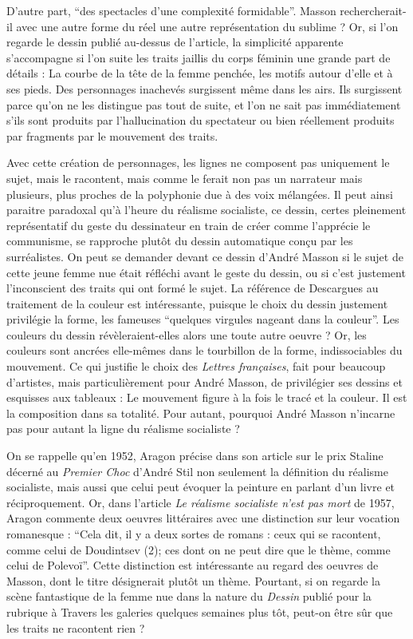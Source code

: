 	D’autre part, \enquote{des spectacles d’une complexité formidable}. Masson rechercherait-il avec une autre forme du réel une autre représentation du sublime ?  Or, si l’on regarde le dessin publié au-dessus de l’article, la simplicité apparente s’accompagne si l’on suite les traits jaillis du corps féminin une grande part de détails : La courbe de la tête de la femme penchée, les motifs autour d’elle et à ses pieds. Des personnages inachevés surgissent même dans les airs. Ils surgissent parce qu’on ne les distingue pas tout de suite, et l’on ne sait pas immédiatement s’ils sont produits par l’hallucination du spectateur ou bien réellement produits par fragments par le mouvement des traits. 

	Avec cette création de personnages, les lignes ne composent pas uniquement le sujet, mais le racontent, mais comme le ferait non pas un narrateur mais plusieurs, plus proches de la polyphonie due à des voix mélangées. Il peut ainsi paraitre paradoxal qu’à l’heure du réalisme socialiste, ce dessin, certes pleinement représentatif du geste du dessinateur en train de créer comme l’apprécie le communisme, se rapproche plutôt du dessin automatique conçu par les surréalistes. On peut se demander devant ce dessin d’André Masson si le sujet de cette jeune femme nue était réfléchi avant le geste du dessin, ou si c’est justement l’inconscient des traits qui ont formé le sujet. La référence de Descargues au traitement de la couleur est intéressante, puisque le choix du dessin justement privilégie la forme, les fameuses \enquote{quelques virgules nageant dans la couleur}. Les couleurs du dessin révèleraient-elles alors une toute autre oeuvre ? Or, les couleurs sont ancrées elle-mêmes dans le tourbillon de la forme, indissociables du mouvement. Ce qui justifie le choix des \emph{Lettres françaises}, fait pour beaucoup d’artistes, mais particulièrement pour André Masson, de privilégier ses dessins et esquisses aux tableaux : Le mouvement figure à la fois le tracé et la couleur. Il est la composition dans sa totalité. Pour autant, pourquoi André Masson n’incarne pas pour autant la ligne du réalisme socialiste ? 


On se rappelle qu’en 1952, Aragon précise dans son article sur le prix Staline décerné au \emph{Premier Choc} d’André Stil non seulement la définition du réalisme socialiste, mais aussi que celui peut évoquer la peinture en parlant d’un livre et réciproquement. Or, dans l’article \emph{Le réalisme socialiste n’est pas mort} de 1957, Aragon commente deux oeuvres littéraires avec une distinction sur leur vocation romanesque : \enquote{Cela dit, il y a deux sortes de romans : ceux qui se racontent, comme celui de Doudintsev (2); ces dont on ne peut dire que le thème, comme celui de Polevoï}. Cette distinction est intéressante au regard des oeuvres de Masson, dont le titre désignerait plutôt un thème. Pourtant, si on regarde la scène fantastique de la femme nue dans la nature du \emph{Dessin }publié pour la rubrique à Travers les galeries quelques semaines plus tôt, peut-on être sûr que les traits ne racontent rien ? 

